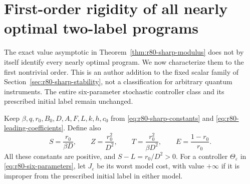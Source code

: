 \section{First-order rigidity of all nearly optimal two-label programs}
\label{sec:dot-first-order-rigidity}

The exact value asymptotic in Theorem~\ref{thm:r80-sharp-modulus}
does not by itself identify every nearly optimal program.  We now
characterize them to the first nontrivial order.  This is an author
addition to the fixed scalar family of Section~\ref{sec:r80-sharp-stability},
not a classification for arbitrary quantum instruments.  The entire
six-parameter stochastic controller class and its prescribed initial
label remain unchanged.

Keep $\beta,q,r_0,B_0,D,A,F,L,k,h,c_0$ from
\eqref{eq:r80-sharp-constants} and
\eqref{eq:r80-leading-coefficients}.  Define also
\begin{equation}\label{eq:dot-rigidity-coefficients}
 S=\frac{r_0}{\beta D},\qquad
 Z=\frac{r_0^2}{D^2},\qquad
 T=\frac{r_0^2}{\beta D^2},\qquad
 E=\frac{1-r_0}{r_0}.
\end{equation}
All these constants are positive, and $S-L=r_0/D^2>0$.
For a controller $\Theta_\varepsilon$ in
\eqref{eq:r80-six-parameters}, let $J_\varepsilon$ be its worst
model cost, with value $+\infty$ if it is improper from the
prescribed initial label in either model.

